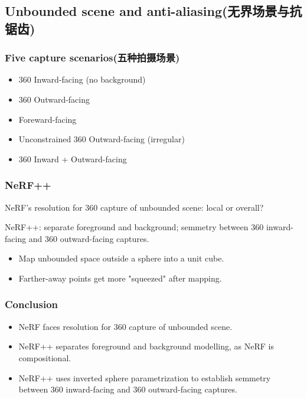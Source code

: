\documentclass[cn,hazy,blue,14pt,screen]{elegantnote}
\begin{document}
\subsection{Unbounded scene and anti-aliasing(无界场景与抗锯齿)}

\subsubsection{Five capture scenarios(五种拍摄场景)}

\begin{itemize}
\item 360 Inward-facing (no background)
\item 360 Outward-facing
\item Foreward-facing
\item Unconstrained 360 Outward-facing (irregular)
\item 360 Inward + Outward-facing
\end{itemize}

\subsubsection{NeRF++}

NeRF's resolution for 360 capture of unbounded scene: local or overall?

NeRF++: separate foreground and background; semmetry between 360 inward-facing and 360 outward-facing captures.\cite{zhang2020nerf++}

\begin{itemize}
\item Map unbounded space outside a sphere into a unit cube.
\item Farther-away points get more "squeezed" after mapping.
\end{itemize}

\subsubsection{Conclusion}

\begin{itemize}
\item NeRF faces resolution for 360 capture of unbounded scene.
\item NeRF++ separates foreground and background modelling, as NeRF is compositional.
\item NeRF++ uses inverted sphere parametrization to establish semmetry between 360 inward-facing and 360 outward-facing captures.
\end{itemize}
\end{document}
